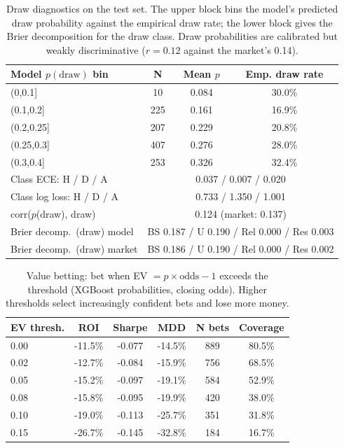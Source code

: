 \documentclass[10pt]{article}
\begin{document}
\begin{table}[htbp]
\centering
\caption{Draw diagnostics on the test set. The upper block bins the model's
predicted draw probability against the empirical draw rate; the lower block gives
the Brier decomposition for the draw class. Draw probabilities are calibrated but
weakly discriminative ($r = 0.12$ against the market's 0.14).}
\label{tab:draw}
\begin{tabular}{lccc}
\toprule
Model $p(\mathrm{draw})$ bin & N & Mean $p$ & Emp. draw rate \\
\midrule
(0,0.1] & 10 & 0.084 & 30.0\% \\
(0.1,0.2] & 225 & 0.161 & 16.9\% \\
(0.2,0.25] & 207 & 0.229 & 20.8\% \\
(0.25,0.3] & 407 & 0.276 & 28.0\% \\
(0.3,0.4] & 253 & 0.326 & 32.4\% \\
\midrule
Class ECE: H / D / A & \multicolumn{3}{c}{0.037 / 0.007 / 0.020} \\
Class log loss: H / D / A & \multicolumn{3}{c}{0.733 / 1.350 / 1.001} \\
corr($p$(draw), draw) & \multicolumn{3}{c}{0.124 (market: 0.137)} \\
Brier decomp.\ (draw) model & \multicolumn{3}{c}{BS 0.187 / U 0.190 / Rel 0.000 / Res 0.003} \\
Brier decomp.\ (draw) market & \multicolumn{3}{c}{BS 0.186 / U 0.190 / Rel 0.000 / Res 0.002} \\
\bottomrule
\end{tabular}
\end{table}

\begin{table}[htbp]
\centering
\caption{Value betting: bet when EV $= p \times \mathrm{odds} - 1$ exceeds the
threshold (XGBoost probabilities, closing odds). Higher thresholds select
increasingly confident bets and lose more money.}
\label{tab:value}
\small
\begin{tabular}{lccccc}
\toprule
EV thresh. & ROI & Sharpe & MDD & N bets & Coverage \\
\midrule
0.00 & -11.5\% & -0.077 & -14.5\% & 889 & 80.5\% \\
0.02 & -12.7\% & -0.084 & -15.9\% & 756 & 68.5\% \\
0.05 & -15.2\% & -0.097 & -19.1\% & 584 & 52.9\% \\
0.08 & -15.8\% & -0.095 & -19.9\% & 420 & 38.0\% \\
0.10 & -19.0\% & -0.113 & -25.7\% & 351 & 31.8\% \\
0.15 & -26.7\% & -0.145 & -32.8\% & 184 & 16.7\% \\
\bottomrule
\end{tabular}
\end{table}
\end{document}
